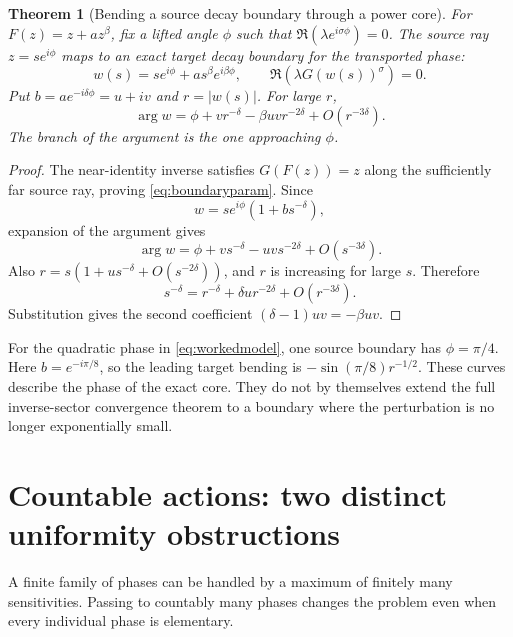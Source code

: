 \documentclass[11pt,a4paper]{article}
\newtheorem{theorem}{Theorem}[section]
\theoremstyle{definition}
\theoremstyle{remark}
\numberwithin{equation}{section}
\begin{document}
\begin{theorem}[Bending a source decay boundary through a power core]\label{thm:boundary}
For $F(z)=z+az^\beta$, fix a lifted angle $\phi$ such that
$\Re(\lambda e^{i\sigma\phi})=0$. The source ray $z=s e^{i\phi}$ maps to an exact target decay boundary for the transported phase:
\begin{equation}\label{eq:boundaryparam}
 w(s)=s e^{i\phi}+a s^\beta e^{i\beta\phi},\qquad
 \Re(\lambda G(w(s))^\sigma)=0.
\end{equation}
Put $b=ae^{-i\delta\phi}=u+iv$ and $r=|w(s)|$. For large $r$,
\begin{equation}\label{eq:bentangle}
 \arg w=\phi+v r^{-\delta}-\beta uv r^{-2\delta}
 +O(r^{-3\delta}).
\end{equation}
The branch of the argument is the one approaching $\phi$.
\end{theorem}
\begin{proof}
The near-identity inverse satisfies $G(F(z))=z$ along the sufficiently far source ray, proving \eqref{eq:boundaryparam}. Since
\[
 w=s e^{i\phi}(1+bs^{-\delta}),
\]
expansion of the argument gives
\[
 \arg w=\phi+v s^{-\delta}-uv s^{-2\delta}+O(s^{-3\delta}).
\]
Also $r=s(1+u s^{-\delta}+O(s^{-2\delta}))$, and $r$ is increasing for large $s$. Therefore
\[
 s^{-\delta}=r^{-\delta}+\delta u r^{-2\delta}+O(r^{-3\delta}).
\]
Substitution gives the second coefficient $(\delta-1)uv=-\beta uv$.
\end{proof}

For the quadratic phase in \eqref{eq:workedmodel}, one source boundary has $\phi=\pi/4$. Here $b=e^{-i\pi/8}$, so the leading target bending is $-\sin(\pi/8)r^{-1/2}$. These curves describe the phase of the exact core. They do not by themselves extend the full inverse-sector convergence theorem to a boundary where the perturbation is no longer exponentially small.

\section{Countable actions: two distinct uniformity obstructions}\label{sec:countable}

A finite family of phases can be handled by a maximum of finitely many sensitivities. Passing to countably many phases changes the problem even when every individual phase is elementary.
\end{document}
